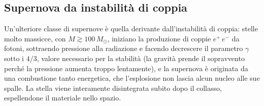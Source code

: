 \documentclass[11pt, a4paper]{scrartcl}
\theoremstyle{style}
\theoremstyle{style1}
\numberwithin{equation}{subsection}
\begin{document}
\subsection{Supernova da instabilit\`a di coppia}
Un'ulteriore classe di supernove \`e quella derivante dall'instabilit\`a di coppia: stelle molto massicce, con $M \gtrsim 100 \, M_\odot $, iniziano la produzione di coppie $e^+\, e^-$ da fotoni, sottraendo pressione alla radiazione e facendo decrescere il parametro $\gamma$ sotto i $4/3$, valore necessario per la stabilit\`a (la gravit\`a prende il sopravvento perch\'e la pressione aumenta troppo lentamente), e la supernova \`e originata da una combustione tanto energetica, che l'esplosione non lascia alcun nucleo alle sue spalle. 
La stella viene interamente disintegrata subito dopo il collasso, espellendone il materiale nello spazio.






















\newpage
\appendix
\end{document}
